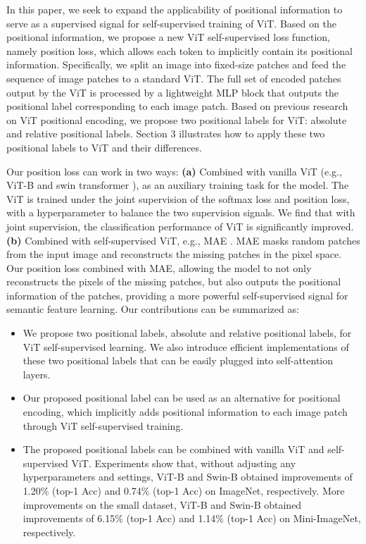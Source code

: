 \documentclass{article}
\begin{document}
In this paper, we seek to expand the applicability of positional information to serve as a supervised signal for self-supervised training of ViT. Based on the positional information, we propose a new ViT self-supervised loss function, namely position loss, which allows each token to implicitly contain its positional information. Specifically, we split an image into fixed-size patches and feed the sequence of image patches to a standard ViT. The full set of encoded patches output by the ViT is processed by a lightweight MLP block that outputs the positional label corresponding to each image patch. Based on previous research on ViT positional encoding, we propose two positional labels for ViT: absolute and relative positional labels. Section 3 illustrates how to apply these two positional labels to ViT and their differences.

Our position loss can work in two ways: \textbf{(a)} Combined with vanilla ViT (e.g., ViT-B \cite{DBLP:journals/corr/abs-2010-11929} and swin transformer \cite{Liu_2021_ICCV}), as an auxiliary training task for the model. The ViT is trained under the joint supervision of the softmax loss and position loss, with a hyperparameter to balance the two supervision signals. We find that with joint supervision, the classification performance of ViT is significantly improved. \textbf{(b)} Combined with self-supervised ViT, e.g., MAE \cite{DBLP:journals/corr/abs-2111-06377}. MAE masks random patches from the input image and reconstructs the missing patches in the pixel space. Our position loss combined with MAE, allowing the model to not only reconstructs the pixels of the missing patches, but also outputs the positional information of the patches, providing a more powerful self-supervised signal for semantic feature learning. Our contributions can be summarized as:
\begin{itemize}
\item We propose two positional labels, absolute and relative positional labels, for ViT self-supervised learning. We also introduce efficient implementations of these two positional labels that can be easily plugged into self-attention layers.
\item Our proposed positional label can be used as an alternative for positional encoding, which implicitly adds positional information to each image patch through ViT self-supervised training.
\item The proposed positional labels can be combined with vanilla ViT and self-supervised ViT. Experiments show that, without adjusting any hyperparameters and settings, ViT-B and Swin-B obtained improvements of 1.20\% (top-1 Acc) and 0.74\% (top-1 Acc) on ImageNet, respectively. More improvements on the small dataset, ViT-B and Swin-B obtained improvements of 6.15\% (top-1 Acc) and 1.14\% (top-1 Acc) on Mini-ImageNet, respectively.
\end{itemize}
\end{document}
